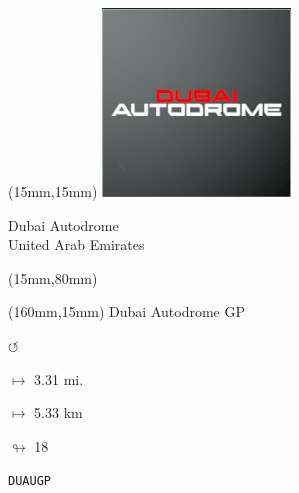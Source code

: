 \begin{textblock*}{50mm}(15mm,15mm)%
\includegraphics[width=50mm]{LG/2015-05-20_00081.png}
\par Dubai Autodrome\\ United Arab Emirates
\end{textblock*}
\begin{textblock*}{185mm}(15mm,80mm)%
\end{textblock*}
\begin{textblock*}{40mm}(160mm,15mm)%
Dubai Autodrome GP
\par \Huge$\circlearrowleft$
\Large
\par$\mapsto$ 3.31 mi.
\par$\mapsto$ 5.33 km
\par$\looparrowright$ 18
\par\hfill\tiny\tt DUAUGP\\
\end{textblock*}
\null\newpage

